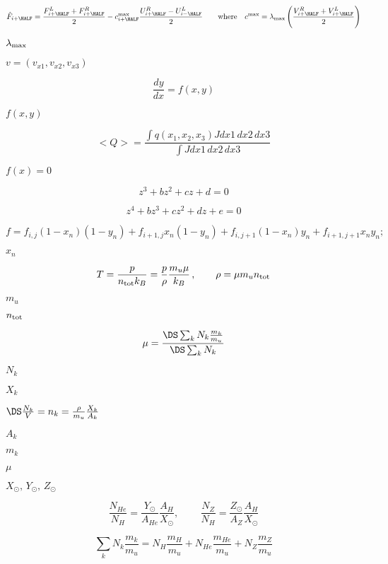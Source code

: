 \documentclass{article}
\begin{document}
\[
    \hat{F}_{i+\HALF} = \frac{F^L_{i+\HALF} + F^R_{i+\HALF}}{2}
 - c^{\rm max}_{i+\HALF}\frac{U^R_{i+\HALF} - U^L_{i-\HALF}}{2}
   \qquad{\rm where}\quad c^{\rm max} = \lambda_{\rm max}\left(
        \frac{V^R_{i+\HALF} + V^L_{i+\HALF}}{2}\right)
\]
\pagebreak

$\lambda_{\rm \max}$
\pagebreak

$ v = (v_{x1}, v_{x2}, v_{x3})$
\pagebreak

\[
     \frac{dy}{dx} = f(x,y)
 \]
\pagebreak

$f(x,y)$
\pagebreak

\[
   <Q> = \frac{\int q(x_1, x_2, x_3) J dx1\,dx2\,dx3}
              {\int J dx1\,dx2\,dx3} 
\]
\pagebreak

$ f(x) = 0$
\pagebreak

\[
     z^3 + bz^2 + cz + d = 0
 \]
\pagebreak

\[
     z^4 + bz^3 + cz^2 + dz + e = 0
\]
\pagebreak

\[
     f =   f_{i,j}(1 - x_n)(1 - y_n) + f_{i+1,j}x_n(1 - y_n)
         + f_{i,j+1}(1 - x_n)y_n     + f_{i+1,j+1}x_ny_n;
  \]
\pagebreak

$ x_n$
\pagebreak

\[
  T = \frac{p}{n_{\rm tot}k_B} = \frac{p}{\rho}\frac{m_u\mu}{k_B}
  \,,\qquad
  \rho = \mu m_u n_{\rm tot}
\]
\pagebreak

$ m_u $
\pagebreak

$ n_{\rm tot} $
\pagebreak

\[ 
  \mu = \frac{\DS\sum_k N_k \frac{m_k}{m_u}}{\DS\sum_k N_k}
\]
\pagebreak

$ N_k $
\pagebreak

$X_k$
\pagebreak

$\DS \frac{N_k}{V} = n_k = \frac{\rho}{m_u}\frac{X_k}{A_k}$
\pagebreak

$A_k$
\pagebreak

$ m_k $
\pagebreak

$\mu$
\pagebreak

$ X_{\odot},\, Y_{\odot},\, Z_{\odot}$
\pagebreak

\[
     \frac{N_{He}}{N_H} = \frac{Y_{\odot}}{A_{He}}\frac{A_H}{X_\odot}
     ,\,\qquad
     \frac{N_Z}{N_H} = \frac{Z_{\odot}}{A_{Z}}\frac{A_H}{X_\odot}
   \]
\pagebreak

\[
     \sum_k N_k \frac{m_k}{m_u} =   N_H   \frac{m_H}{m_u}
                                  + N_{He}\frac{m_{He}}{m_u}
                                  + N_Z   \frac{m_Z}{m_u}
   \]
\pagebreak
\end{document}
